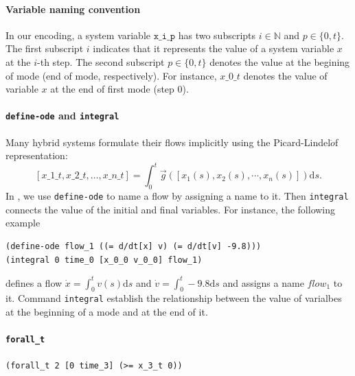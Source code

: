 \paragraph{Variable naming convention}
In our encoding, a system variable $\texttt{x\_i\_p}$ has two
subscripts $i \in \mathbb{N}$ and $p \in \{0, t\}$. The first
subscript $i$ indicates that it represents the value of a system
variable $x$ at the $i$-th step. The second subscript $p \in \{0, t\}$
denotes the value at the begining of mode (end of mode,
respectively). For instance, $x\_0\_t$ denotes the value of variable
$x$ at the end of first mode (step 0).

\paragraph{\texttt{define-ode} and \texttt{integral}}
Many hybrid systems formulate their flows implicitly using
the Picard-Lindel$\ddot{o}$f representation:
\[
[x\_1\_t, x\_2\_t, \dots, x\_n\_t] = \int_0^t \vec{g}([x_1(s), x_2(s), \cdots,
x_n(s)]) \mathrm{d}s.
\]
In \dReach{}, we use \texttt{define-ode} to name a flow by assigning
a name to it. Then \texttt{integral} connects the value of the initial
and final variables. For instance, the following example

\begin{Verbatim}[fontfamily=courier]
(define-ode flow_1 ((= d/dt[x] v) (= d/dt[v] -9.8)))
(integral 0 time_0 [x_0_0 v_0_0] flow_1)
\end{Verbatim}

defines a flow $\dot{x} = \int_0^t v(s) \mathrm{d}s$ and $\dot{v} =
\int_0^t -9.8 \mathrm{d}s$ and assigns a name $\mathit{flow_1}$ to it.
Command \texttt{integral} establish the relationship between the value
of varialbes at the beginning of a mode and at the end of it.

\paragraph{\texttt{forall\_t}}
\begin{Verbatim}[fontfamily=courier]
(forall_t 2 [0 time_3] (>= x_3_t 0))
\end{Verbatim}

